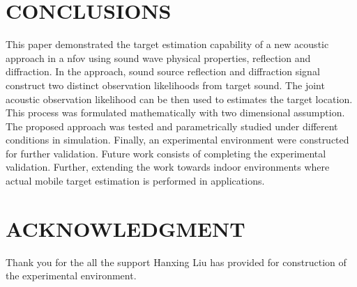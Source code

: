 \documentclass[letterpaper, 10 pt, conference]{ieeeconf}  %
\begin{document}
\section{CONCLUSIONS}
This paper demonstrated the target estimation capability of a new acoustic approach in a \gls{nfov} using sound wave physical properties, reflection and diffraction. In the approach, sound source reflection and diffraction signal construct two distinct observation likelihoods from target sound. The joint acoustic observation likelihood can be then used to estimates the target location. This process was formulated mathematically with two dimensional assumption. The proposed approach was tested and parametrically studied under different conditions in simulation. Finally, an experimental environment were constructed for further validation.
Future work consists of completing the experimental validation. Further, extending the work towards indoor environments where actual mobile target estimation is performed in applications.
\addtolength{\textheight}{-10cm}

                                  
            
\section*{ACKNOWLEDGMENT}
Thank you for the all the support Hanxing Liu has provided for construction of the experimental environment.

\end{document}
